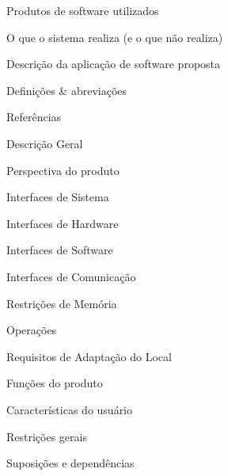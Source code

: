 \documentclass[
	article,			%
	11pt,				%
	oneside,			%
	a4paper,			%
	english,			%
	brazil,				%
	sumario=tradicional
	]{abntex2}
\begin{document}
\hspace{2cm}Produtos de software utilizados\dotfill \pageref{sec:Produtos}

\hspace{2cm}O que o sistema realiza (e o que não realiza)\dotfill \pageref{sec:Realiza}

\hspace{2cm}Descrição da aplicação de software proposta\dotfill \pageref{sec:DescricaoAplicacao}

\hspace{1cm}Definições \& abreviações\dotfill \pageref{sec:Definicoes}

\hspace{1cm}Referências\dotfill \pageref{sec:Referencias}

Descrição Geral\dotfill \pageref{sec:DescricaoGeral}

\hspace{1cm}Perspectiva do produto\dotfill \pageref{sec:PerspectivaProduto}

\hspace{2cm}Interfaces de Sistema\dotfill \pageref{sec:InterfaceSistema}

\hspace{2cm}Interfaces de Hardware\dotfill \pageref{sec:InterfaceHardware}

\hspace{2cm}Interfaces de Software\dotfill \pageref{sec:InterfaceSoftware}

\hspace{2cm}Interfaces de Comunicação\dotfill \pageref{sec:InterfaceComunicacao}

\hspace{2cm}Restrições de Memória\dotfill \pageref{sec:RestricoesMemoria}

\hspace{2cm}Operações\dotfill \pageref{sec:Operacoes}

\hspace{2cm}Requisitos de Adaptação do Local\dotfill \pageref{sec:RequisitosLocal}

\hspace{1cm}Funções do produto\dotfill \pageref{sec:FuncoesProduto}

\hspace{1cm}Características do usuário\dotfill \pageref{sec:CaracteristicasUsuario}

\hspace{1cm}Restrições gerais\dotfill \pageref{RestricoesGeral}

\hspace{1cm}Suposições e dependências\dotfill \pageref{sec:Suposicoes}
\end{document}
